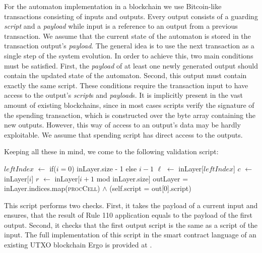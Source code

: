 \documentclass[runningheads]{llncs}
\newcommand{\payload}{\textit{payload}}
\newcommand{\script}{\textit{script}}
\def\Let#1#2{\State #1 $\gets$ #2}
\begin{document}
    For the automaton implementation in a blockchain we use Bitcoin-like
    transactions consisting of inputs and outputs. Every output consists of a
    guarding \script{} and a \payload{} while input is a reference to an
    output from a previous transaction.  We assume that the current state of the
    automaton is stored in the transaction output's \payload{}.  The general
    idea is to use the next transaction as a single step of the system
    evolution. In order to achieve this, two main conditions must be satisfied.
    First, the \payload{} of at least one newly generated output should contain
    the updated state of the automaton. Second, this output must contain exactly
    the same script. These conditions require the transaction input to have
    access to the output's \script{}s and \payload{}s.  It is implicitly present
    in the vast amount of existing blockchains, since in most cases scripts
    verify the signature of the spending transaction, which is constructed over
    the byte array containing the new outputs.  However, this way of access to
    an output's data may be hardly exploitable.  We assume that
    spending script has direct access to the outputs.

    Keeping all these in mind, we come to the following validation script:

    \begin{algorithm}[H]
        \caption{Script, that ensures that the transaction performs correct rule 110 transformation
        keeping the same rules for further iterations}
        \label{alg:isRule110}
        \begin{algorithmic}[1]
            \Let{$leftIndex$}{if($i=0$) inLayer.size - 1 else $i-1$}
            \Let{$\ell$}{inLayer[$leftIndex$]}
            \Let{$c$}{inLayer[$i$]}
            \Let{$r$}{inLayer[$i+1$ mod inLayer.size]}
            \State
            \Return {}
            \EndFunction
            \State \Return outLayer = inLayer.indices.map(\textsc{procCell})
            \EndFunction
            \State
            \Return {}
            $\wedge$ (self.script = out[0].script)
            \EndFunction
        \end{algorithmic}
    \end{algorithm}

    This script performs two checks. First, it takes the payload of a current
    input and ensures, that the result of Rule 110 application equals to the
    payload of the first output. Second, it checks that the first output script
    is the same as a script of the input. The full implementation of this script
    in the smart contract language of an existing UTXO blockchain Ergo is
    provided at \cite{ergoScript1}.
\end{document}
